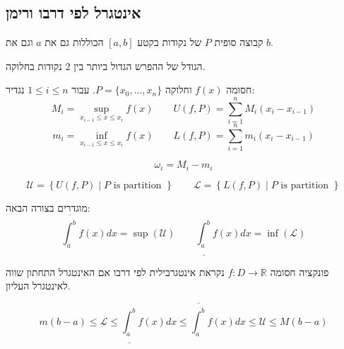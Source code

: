 \documentclass{tstextbook}
\begin{document}
\subsection{אינטגרל לפי דרבו ורימן}

\begin{definition}
קבוצה סופית \(P\) של נקודות בקטע \([a,b]\) הכוללות גם את \(a\) וגם את \(b\).

\end{definition}
\begin{definition}
הגודל של ההפרש הגדול ביותר בין 2 נקודות בחלוקה.

\end{definition}
\begin{definition}
חסומה \(f(x)\) וחלוקה \(P=\{x_0, ... , x_n\}\). עבור \(1\leq i\leq n\) נגדיר:
$$M_i = \underset{x_{i-1}\leq x\leq x_i}{\sup}f(x)\qquad U(f,P)=\sum_{i=1}^{n} M_i (x_i - x_{i-1})$$$$m_i = \underset{x_{i-1}\leq x\leq x_i}{\inf}f(x)\qquad L(f,P)=\sum_{i=1}^{n} m_i (x_i - x_{i-1}) $$

\end{definition}
\begin{definition}
$$\omega_i = M_i - m_i$$

\end{definition}
\begin{definition}
$$\mathcal{U} = \left\{U(f,P) \mid P \text{ is partition } \right\}\qquad \mathcal{L} = \left\{L(f,P) \mid P \text{ is partition } \right\}$$

\end{definition}
\begin{definition}
מוגדרים בצורה הבאה:
$$\overline{\int_a^b} f(x) dx = \sup(\mathcal{U})\qquad \underline{\int_a^b} f(x)dx=\inf(\mathcal{L})$$

\end{definition}
\begin{definition}
פונקציה חסומה \(f:D\to \mathbb{R}\) נקראת אינטגרבילית לפי דרבו אם האינטגרל התחתון שווה לאינטגרל העליון.

\end{definition}
\begin{proposition}
$$m(b-a)\leq \mathcal{L}\leq \underline{\int_a^b} f(x)dx \leq \overline{\int_a^b} f(x) dx \leq \mathcal{U}\leq M(b-a)$$

\end{proposition}
\end{document}
